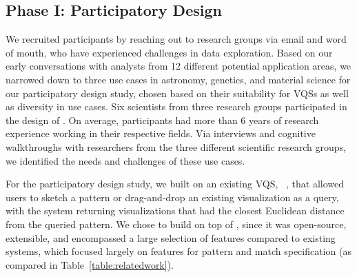 \vspace{-10pt}
\subsection{Phase I: Participatory Design}
\par We recruited participants by reaching out to research groups via email and word of mouth, who have experienced challenges in data exploration. Based on our early conversations with analysts from 12 different potential application areas, we narrowed down to three use cases in astronomy, genetics, and material science for our participatory design study, chosen based on their suitability for VQSs as well as diversity in use cases. Six scientists from three research groups participated in the design of \zv. On average, participants had more than 6 years of research experience working in their respective fields. Via interviews and cognitive walkthroughs with researchers from the three different scientific research groups, we identified the needs and challenges of these use cases.
\par For the participatory design study, we built on an existing VQS, \zv~\cite{Siddiqui2017,Siddiqui2017VLDB}, that allowed users to sketch a pattern or drag-and-drop an existing visualization as a query, with the system returning visualizations that had the closest Euclidean distance from the queried pattern. We chose to build on top of \zv, since it was open-source, extensible, and encompassed a large selection of features compared to existing systems, which focused largely on features for pattern and match specification (as compared in Table~\ref{table:relatedwork}).

